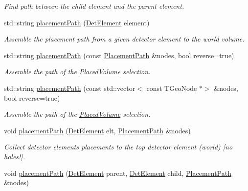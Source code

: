 \begin{DoxyCompactItemize}
\begin{DoxyCompactList}\small\item\em Find path between the child element and the parent element. \end{DoxyCompactList}\item 
std\+::string \hyperlink{namespace_d_d4hep_1_1_geometry_1_1_detector_tools_a1ca0d88ab941b6dde4776c6b3b893fb6}{placement\+Path} (\hyperlink{class_d_d4hep_1_1_geometry_1_1_det_element}{Det\+Element} element)
\begin{DoxyCompactList}\small\item\em Assemble the placement path from a given detector element to the world volume. \end{DoxyCompactList}\item 
std\+::string \hyperlink{namespace_d_d4hep_1_1_geometry_1_1_detector_tools_a792502fe2b1afaa030b9697151824452}{placement\+Path} (const \hyperlink{namespace_d_d4hep_1_1_geometry_1_1_detector_tools_a6cc33285199e04dd336a33e6e62925e6}{Placement\+Path} \&nodes, bool reverse=true)
\begin{DoxyCompactList}\small\item\em Assemble the path of the \hyperlink{class_d_d4hep_1_1_geometry_1_1_placed_volume}{Placed\+Volume} selection. \end{DoxyCompactList}\item 
std\+::string \hyperlink{namespace_d_d4hep_1_1_geometry_1_1_detector_tools_a766410c432f7324f634be04ec0b16857}{placement\+Path} (const std\+::vector$<$ const T\+Geo\+Node $\ast$$>$ \&nodes, bool reverse=true)
\begin{DoxyCompactList}\small\item\em Assemble the path of the \hyperlink{class_d_d4hep_1_1_geometry_1_1_placed_volume}{Placed\+Volume} selection. \end{DoxyCompactList}\item 
void \hyperlink{namespace_d_d4hep_1_1_geometry_1_1_detector_tools_a4643e9605448f9652b2c95e6ef5619c3}{placement\+Path} (\hyperlink{class_d_d4hep_1_1_geometry_1_1_det_element}{Det\+Element} elt, \hyperlink{namespace_d_d4hep_1_1_geometry_1_1_detector_tools_a6cc33285199e04dd336a33e6e62925e6}{Placement\+Path} \&nodes)
\begin{DoxyCompactList}\small\item\em Collect detector elements placements to the top detector element (world) \mbox{[}no holes!\mbox{]}. \end{DoxyCompactList}\item 
void \hyperlink{namespace_d_d4hep_1_1_geometry_1_1_detector_tools_ae4ebaffda73014e393cf33ea3bfe0870}{placement\+Path} (\hyperlink{class_d_d4hep_1_1_geometry_1_1_det_element}{Det\+Element} parent, \hyperlink{class_d_d4hep_1_1_geometry_1_1_det_element}{Det\+Element} child, \hyperlink{namespace_d_d4hep_1_1_geometry_1_1_detector_tools_a6cc33285199e04dd336a33e6e62925e6}{Placement\+Path} \&nodes)
$$
\end{DoxyCompactItemize}
